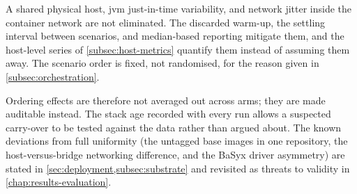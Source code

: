 A shared physical host, \gls{jvm} just-in-time variability, and network jitter inside the container network are not eliminated. The discarded warm-up, the settling interval between scenarios, and median-based reporting mitigate them, and the host-level series of \cref{subsec:host-metrics} quantify them instead of assuming them away. The scenario order is fixed, not randomised, for the reason given in \cref{subsec:orchestration}.

Ordering effects are therefore not averaged out across arms; they are made auditable instead. The stack age recorded with every run allows a suspected carry-over to be tested against the data rather than argued about. The known deviations from full uniformity (the untagged base images in one repository, the host-versus-bridge networking difference, and the BaSyx driver asymmetry) are stated in \cref{sec:deployment,subsec:substrate} and revisited as threats to validity in \cref{chap:results-evaluation}.
